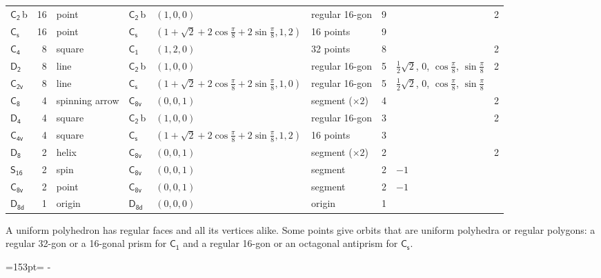 \documentclass[10pt,a4paper]{article}
\newcommand{\needspace}[1]{\par\penalty-100\begingroup\dimen0=#1\relax\dimen2=\pagegoal
  \advance\dimen2-\pagetotal\ifdim\dimen0>\dimen2\relax\ifdim\dimen2>0pt\vfil\break\fi\fi
  \endgroup}
\numberwithin{equation}{section}
\newcommand{\grp}[1]{\mathsf{#1}}
\newcommand{\clsletter}[1]{\,{\scriptsize\color{black!55}#1}}
\newlength{\fillwidth}\newlength{\cellwidth}\newlength{\colwidth}
\begin{document}
{{\begin{longtable}{@{}lrllllr>{\RaggedRight\arraybackslash}p{\fillwidth}r@{}}
\href{C2.pdf}{$\grp{C_{2}}$}\clsletter{b} & 16 & point & \href{C2.pdf}{$\grp{C_{2}}$}\clsletter{b} & $(1, 0, 0)$ & regular 16-gon & 9 &  & 2\\
\href{C1v.pdf}{$\grp{C_{s}}$} & 16 & point & \href{C1v.pdf}{$\grp{C_{s}}$} & $(1 + \sqrt{2} + 2\cos\tfrac{\pi}{8} + 2\sin\tfrac{\pi}{8}, 1, 2)$ & 16 points & 9 &  & \\
\href{C4.pdf}{$\grp{C_{4}}$} & 8 & square & \href{C1.pdf}{$\grp{C_{1}}$} & $(1, 2, 0)$ & 32 points & 8 &  & 2\\
\href{D2.pdf}{$\grp{D_{2}}$} & 8 & line & \href{C2.pdf}{$\grp{C_{2}}$}\clsletter{b} & $(1, 0, 0)$ & regular 16-gon & 5 & ${\tfrac{1}{2}\sqrt{2}}$, ${0}$, ${\cos\tfrac{\pi}{8}}$, ${\sin\tfrac{\pi}{8}}$ & 2\\
\href{C2v.pdf}{$\grp{C_{2v}}$} & 8 & line & \href{C1v.pdf}{$\grp{C_{s}}$} & $(1 + \sqrt{2} + 2\cos\tfrac{\pi}{8} + 2\sin\tfrac{\pi}{8}, 1, 0)$ & regular 16-gon & 5 & ${\tfrac{1}{2}\sqrt{2}}$, ${0}$, ${\cos\tfrac{\pi}{8}}$, ${\sin\tfrac{\pi}{8}}$ & \\
\href{C8.pdf}{$\grp{C_{8}}$} & 4 & spinning arrow & \href{C8v.pdf}{$\grp{C_{8v}}$} & $(0, 0, 1)$ & segment (${\times}2$) & 4 &  & 2\\
\href{D4.pdf}{$\grp{D_{4}}$} & 4 & square & \href{C2.pdf}{$\grp{C_{2}}$}\clsletter{b} & $(1, 0, 0)$ & regular 16-gon & 3 &  & 2\\
\href{C4v.pdf}{$\grp{C_{4v}}$} & 4 & square & \href{C1v.pdf}{$\grp{C_{s}}$} & $(1 + \sqrt{2} + 2\cos\tfrac{\pi}{8} + 2\sin\tfrac{\pi}{8}, 1, 2)$ & 16 points & 3 &  & \\
\href{D8.pdf}{$\grp{D_{8}}$} & 2 & helix & \href{C8v.pdf}{$\grp{C_{8v}}$} & $(0, 0, 1)$ & segment (${\times}2$) & 2 &  & 2\\
\href{S16.pdf}{$\grp{S_{16}}$} & 2 & spin & \href{C8v.pdf}{$\grp{C_{8v}}$} & $(0, 0, 1)$ & segment & 2 & ${-1}$ & \\
\href{C8v.pdf}{$\grp{C_{8v}}$} & 2 & point & \href{C8v.pdf}{$\grp{C_{8v}}$} & $(0, 0, 1)$ & segment & 2 & ${-1}$ & \\*
\href{D8d.pdf}{$\grp{D_{8d}}$} & 1 & origin & \href{D8d.pdf}{$\grp{D_{8d}}$} & $(0, 0, 0)$ & origin & 1 &  & \\
\bottomrule\end{longtable}}}
A uniform polyhedron has regular faces and all its vertices alike. Some points give orbits that are uniform polyhedra or regular polygons: a regular 32-gon or a 16-gonal prism for \href{C1.pdf}{$\grp{C_{1}}$} and a regular 16-gon or an octagonal antiprism for \href{C1v.pdf}{$\grp{C_{s}}$}.
\needspace{153pt}
\end{document}

